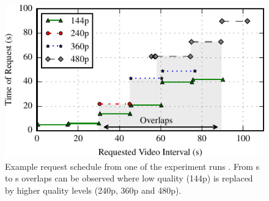 \begin{figure}[t]
\centering
\includegraphics[width=0.9\linewidth]{figs/eg_request_schedule}%
\caption{Example request schedule from one of the experiment runs \cite{sieber16sacrificing}. From \unit[30]{s} to \unit[90]{s} overlaps can be observed where low quality (144p) is replaced by higher quality levels (240p, 360p and 480p).}
\label{fig:request_schedule}%
\end{figure}
